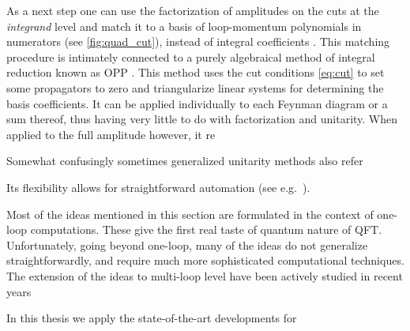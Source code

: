 As a next step one can use the factorization of amplitudes on the cuts at the \emph{integrand} level  and match
it to a basis of loop-momentum polynomials in numerators (see \cref{fig:quad_cut}),
instead of integral coefficients \cite{Giele:2008ve,Ellis:2007br,Ellis:2008ir,Berger:2008sj}.
This matching procedure is intimately connected to a purely algebraical method of integral reduction known as OPP \cite{Ossola:2006us}.
This method uses the cut conditions \cref{eq:cut} to set some propagators to zero and triangularize linear systems for determining the basis coefficients.
It can be applied individually to each Feynman diagram or a sum thereof, thus having very little to do with factorization and unitarity.
When applied to the full amplitude however, it re

Somewhat confusingly sometimes generalized unitarity methods also refer 

Its flexibility allows for straightforward automation (see e.g.\ \cite{Berger:2008ag,Berger:2008sj,Cullen:2011ac,Mastrolia:2010nb,Ossola:2007ax}).

Most of the ideas mentioned in this section are formulated in the context of one-loop computations.
These give the first real taste of quantum nature of QFT.
Unfortunately, going beyond one-loop, many of the ideas do not generalize straightforwardly,
and require much more sophisticated computational techniques.
The extension of the ideas to multi-loop level have been actively studied in recent years \cite{Ita:2015tya,Abreu:2017idw,Abreu:2017hqn} 

In this thesis we apply the state-of-the-art developments for 


